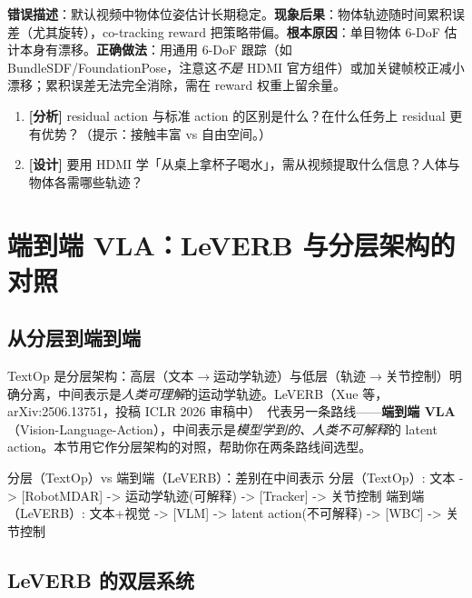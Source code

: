 \begin{pitfall}[物体位姿估计的累积漂移]
\textbf{错误描述}：默认视频中物体位姿估计长期稳定。\textbf{现象后果}：物体轨迹随时间累积误差（尤其旋转），co-tracking reward 把策略带偏。\textbf{根本原因}：单目物体 6-DoF 估计本身有漂移。\textbf{正确做法}：用通用 6-DoF 跟踪（如 BundleSDF/FoundationPose，注意这\emph{不是} HDMI 官方组件）或加关键帧校正减小漂移；累积误差无法完全消除，需在 reward 权重上留余量。
\end{pitfall}

\begin{practice}[练习·HDMI]
\begin{enumerate}
  \item \textbf{[分析]} residual action 与标准 action 的区别是什么？在什么任务上 residual 更有优势？（提示：接触丰富 vs 自由空间。）
  \item \textbf{[设计]} 要用 HDMI 学「从桌上拿杯子喝水」，需从视频提取什么信息？人体与物体各需哪些轨迹？
\end{enumerate}
\end{practice}

\section{端到端 VLA：LeVERB 与分层架构的对照}
\label{sec:rlmc-mm-leverb}

\subsection{从分层到端到端}
\label{sec:rlmc-mm-leverb-pos}

TextOp 是分层架构：高层（文本$\to$运动学轨迹）与低层（轨迹$\to$关节控制）明确分离，中间表示是\emph{人类可理解}的运动学轨迹。LeVERB（Xue 等，arXiv:2506.13751，投稿 ICLR 2026 审稿中）\,\cite{xue2025leverb} 代表另一条路线——\textbf{端到端 VLA}（Vision-Language-Action），中间表示是\emph{模型学到的、人类不可解释}的 latent action。本节用它作分层架构的对照，帮助你在两条路线间选型。

\begin{codebox}{分层（TextOp）vs 端到端（LeVERB）：差别在中间表示}
分层（TextOp）:  文本 -> [RobotMDAR] -> 运动学轨迹(可解释) -> [Tracker] -> 关节控制
端到端（LeVERB）: 文本+视觉 -> [VLM] -> latent action(不可解释) -> [WBC] -> 关节控制
\end{codebox}

\subsection{LeVERB 的双层系统}
\label{sec:rlmc-mm-leverb-arch}

